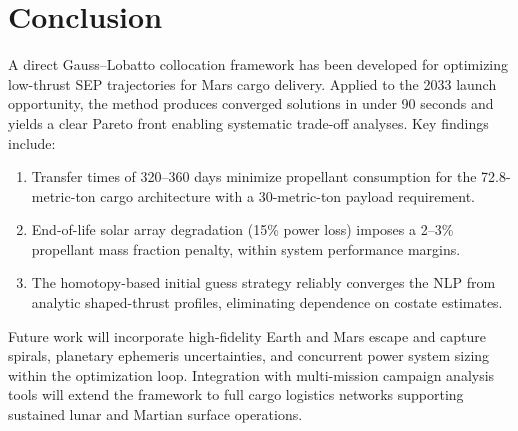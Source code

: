 \section{Conclusion}
\label{sec:conclusion}

A direct Gauss–Lobatto collocation framework has been developed for optimizing
low-thrust SEP trajectories for Mars cargo delivery.  Applied to the 2033 launch
opportunity, the method produces converged solutions in under 90 seconds and
yields a clear Pareto front enabling systematic trade-off analyses.  Key
findings include:

\begin{enumerate}
  \item Transfer times of 320–360 days minimize propellant consumption for the
        72.8-metric-ton cargo architecture with a 30-metric-ton payload requirement.
  \item End-of-life solar array degradation (15\% power loss) imposes a 2–3\%
        propellant mass fraction penalty, within system performance margins.
  \item The homotopy-based initial guess strategy reliably converges the NLP from
        analytic shaped-thrust profiles, eliminating dependence on costate estimates.
\end{enumerate}

Future work will incorporate high-fidelity Earth and Mars escape and capture
spirals, planetary ephemeris uncertainties, and concurrent power system sizing
within the optimization loop.  Integration with multi-mission campaign
analysis tools will extend the framework to full cargo logistics networks
supporting sustained lunar and Martian surface operations.

